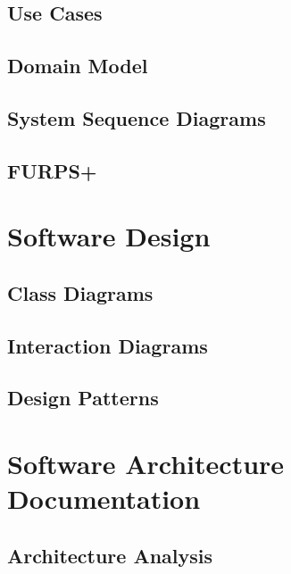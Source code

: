 \documentclass[a4paper,11pt]{article}
\begin{document}
\subsection{Use Cases}


\subsection{Domain Model}


\subsection{System Sequence Diagrams}


\subsection{FURPS+}


\pagebreak
\section{Software Design}


\subsection{Class Diagrams}


\subsection{Interaction Diagrams}


\subsection{Design Patterns}



\pagebreak
\section{Software Architecture Documentation}


\subsection{Architecture Analysis}

\end{document}
